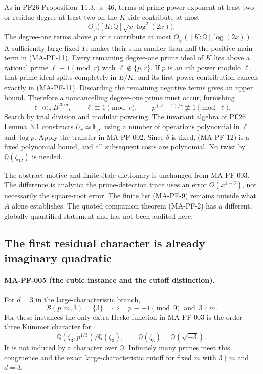 As in PF26 Proposition~11.3, p.~46, terms of prime-power exponent at
least two or residue degree at least two on the $K$ side contribute
at most
\[
 O_\varphi\bigl([K:\mathbb Q]\sqrt{x}\log^2(2x)\bigr).
\]
The degree-one terms above $p$ or $r$ contribute at most
$O_\varphi([K:\mathbb Q]\log(2x))$. A sufficiently large fixed
$T_\delta$ makes their sum smaller than half the positive main term
in (MA-PF-11). Every remaining degree-one prime ideal of $K$ lies
above a rational prime $\ell\equiv1\pmod r$ with
$\ell\notin\{p,r\}$. If $p$ is an $r$th power modulo $\ell$,
that prime ideal splits completely in $E/K$, and its first-power
contribution cancels exactly in (MA-PF-11). Discarding the remaining
negative terms gives an upper bound. Therefore a noncancelling
degree-one prime must occur, furnishing
\[
 \ell\ll_\delta B^{20/\delta},\qquad
 \ell\equiv1\pmod r,\qquad
 p^{(\ell-1)/r}\not\equiv1\pmod\ell.
 \tag{MA-PF-12}
\]
Search by trial division and modular powering. The invariant algebra
of PF26 Lemma~3.1 constructs $U_r\simeq\mathbb F_{p^r}$ using a
number of operations polynomial in $\ell$ and $\log p$. Apply the
transfer in MA-PF-002. Since $\delta$ is fixed, (MA-PF-12) is a
fixed polynomial bound, and all subsequent costs are polynomial.
No twist by $\mathbb Q(\zeta_{12})$ is needed.\hfill$\square$

The abstract motive and finite-\'etale dictionary is unchanged from
MA-PF-003. The difference is analytic: the prime-detection trace uses
an error $O(x^{1-\delta})$, not necessarily the square-root error.
The finite list (MA-PF-9) remains outside what $A$ alone establishes.
The quoted companion theorem (MA-PF-2) has a different, globally
quantified statement and has not been audited here.

\subsection{The first residual character is already imaginary quadratic}

\paragraph{MA-PF-005 (the cubic instance and the cutoff distinction).}
For $d=3$ in the large-characteristic branch,
\[
 \mathcal B(p,m,3)=\{3\}
 \quad\Longleftrightarrow\quad
       p\equiv-1\pmod9\ \text{ and }\ 3\nmid m.
 \tag{MA-PF-13}
\]
For these instances the only extra Hecke function in MA-PF-003 is
the order-three Kummer character for
\[
 \mathbb Q(\zeta_3,p^{1/3})/\mathbb Q(\zeta_3),\qquad
 \mathbb Q(\zeta_3)=\mathbb Q(\sqrt{-3}).
\]
It is not induced by a character over $\mathbb Q$. Infinitely many
primes meet this congruence and the exact large-characteristic cutoff
for fixed $m$ with $3\nmid m$ and $d=3$.

